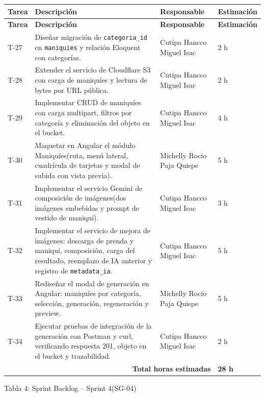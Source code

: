 \documentclass[12pt,a4paper]{article}
\begin{document}
{\small
\begin{longtable}{p{1.2cm} p{7.9cm} p{4.2cm} p{1.7cm}}
\toprule
\textbf{Tarea} & \textbf{Descripción} & \textbf{Responsable} & \textbf{Estimación} \\
\midrule
\endfirsthead

\toprule
\textbf{Tarea} & \textbf{Descripción} & \textbf{Responsable} & \textbf{Estimación} \\
\midrule
\endhead

\bottomrule
\endlastfoot

T-27 & Diseñar migración de \texttt{categoria\_id} en \texttt{maniquies} y relación Eloquent con categorías. & Cutipa Hancco Miguel Isac & 2 h \\
T-28 & Extender el servicio de Cloudflare S3 con carga de maniquíes y lectura de bytes por URL pública. & Cutipa Hancco Miguel Isac & 2 h \\
T-29 & Implementar CRUD de maniquíes con carga multipart, filtros por categoría y eliminación del objeto en el bucket. & Cutipa Hancco Miguel Isac & 4 h \\
T-30 & Maquetar en Angular el módulo Maniquíes(ruta, menú lateral, cuadrícula de tarjetas y modal de subida con vista previa). & Michelly Rocio Paja Quispe & 5 h \\
T-31 & Implementar el servicio Gemini de composición de imágenes(dos imágenes embebidas y prompt de vestido de maniquí). & Cutipa Hancco Miguel Isac & 3 h \\
T-32 & Implementar el servicio de mejora de imágenes: descarga de prenda y maniquí, composición, carga del resultado, reemplazo de IA anterior y registro de \texttt{metadata\_ia}. & Cutipa Hancco Miguel Isac & 5 h \\
T-33 & Rediseñar el modal de generación en Angular: maniquíes por categoría, selección, generación, regeneración y preview. & Michelly Rocio Paja Quispe & 5 h \\
T-34 & Ejecutar pruebas de integración de la generación con Postman y curl, verificando respuesta 201, objeto en el bucket y trazabilidad. & Cutipa Hancco Miguel Isac & 2 h \\

\midrule
\multicolumn{3}{r}{\textbf{Total horas estimadas}} & \textbf{28 h} \\

\end{longtable}
}

\begin{center}
\small Tabla 4: Sprint Backlog -- Sprint 4(SG-04)
\end{center}
\end{document}
